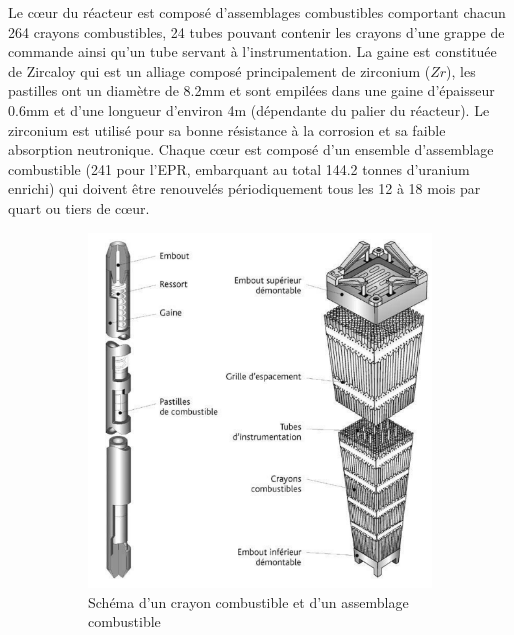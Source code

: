 Le c\oe ur du réacteur est composé d'assemblages combustibles comportant chacun 264 crayons combustibles, 24 tubes pouvant contenir les crayons d'une grappe de commande ainsi qu'un tube servant à l'instrumentation. La gaine est constituée de Zircaloy qui est un alliage composé principalement de zirconium ($Zr$), les pastilles ont un diamètre de 8.2mm et sont empilées dans une gaine d'épaisseur 0.6mm et d'une longueur d'environ 4m (dépendante du palier du réacteur). Le zirconium est utilisé pour sa bonne résistance à la corrosion et sa faible absorption neutronique. Chaque c\oe ur est composé d'un ensemble d'assemblage combustible (241 pour l'EPR, embarquant au total 144.2 tonnes d'uranium enrichi) qui doivent être renouvelés périodiquement tous les 12 à 18 mois par quart ou tiers de c\oe ur.

\begin{figure}[H]
	     \begin{subfigure}[t]{0.45\textwidth}
	     	\centering
	         \includegraphics[width=1\textwidth]{figure/assemb.png}
	         \caption{Schéma d'un crayon combustible et d'un assemblage combustible}
	         \label{subfig:example-image-c}
	     \end{subfigure}%
     	\hfil
     	\begin{subfigure}[t]{0.45\textwidth}

\end{subfigure}
\end{figure}
